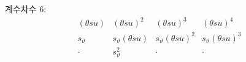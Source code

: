 
\noindent 계수차수 6:
\[
\begin{array}{cccc}
(\theta su)&(\theta su)^2&(\theta su)^3&(\theta su)^4\\
s_\vartheta&s_\vartheta(\theta su)&s_\vartheta(\theta su)^2&s_\vartheta(\theta su)^3\\
\cdot&s_\vartheta^2&\cdot&\cdot
\end{array}
\]
